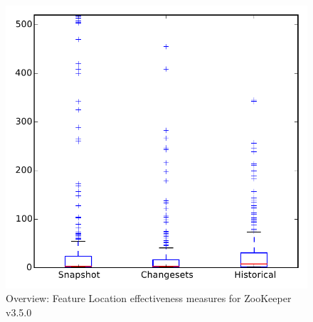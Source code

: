 
\begin{figure}
\centering
\includegraphics[height=0.4\textheight]{figures/flt/all_zookeeper}
\caption{Overview: Feature Location effectiveness measures for ZooKeeper v3.5.0}
\label{fig:flt:all:zookeeper}
\end{figure}
